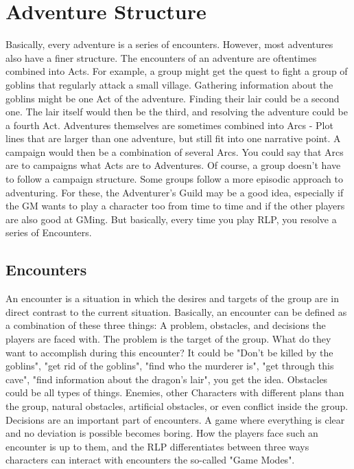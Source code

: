 \chapter{Adventure Structure}
Basically, every adventure is a series of encounters. However, most adventures also have a finer structure. The encounters of an adventure are oftentimes combined into Acts. For example, a group might get the quest to fight a group of goblins that regularly attack a small village. Gathering information about the goblins might be one Act of the adventure. Finding their lair could be a second one. The lair itself would then be the third, and resolving the adventure could be a fourth Act.
Adventures themselves are sometimes combined into Arcs - Plot lines that are larger than one adventure, but still fit into one narrative point. A campaign would then be a combination of several Arcs. You could say that Arcs are to campaigns what Acts are to Adventures.
Of course, a group doesn't have to follow a campaign structure. Some groups follow a more episodic approach to adventuring. For these, the Adventurer's Guild may be a good idea, especially if the GM wants to play a character too from time to time and if the other players are also good at GMing. But basically, every time you play RLP, you resolve a series of Encounters.

\section{Encounters}
An encounter is a situation in which the desires and targets of the group are in direct contrast to the current situation. Basically, an encounter can be defined as a combination of these three things: A problem, obstacles, and decisions the players are faced with.
The problem is the target of the group. What do they want to accomplish during this encounter? It could be "Don't be killed by the goblins", "get rid of the goblins", "find who the murderer is", "get through this cave", "find information about the dragon's lair", you get the idea.
Obstacles could be all types of things. Enemies, other Characters with different plans than the group, natural obstacles, artificial obstacles, or even conflict inside the group.
Decisions are an important part of encounters. A game where everything is clear and no deviation is possible becomes boring. 
How the players face such an encounter is up to them, and the RLP differentiates between three ways characters can interact with encounters the so-called "Game Modes".

